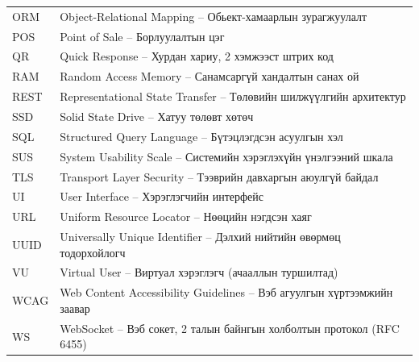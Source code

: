 \documentclass[12pt,a4paper]{report}
\begin{document}
\begin{longtable}{@{} p{3.5cm} p{11cm} @{}}
ORM & Object-Relational Mapping -- Обьект-хамаарлын зурагжуулалт \\[4pt]
POS & Point of Sale -- Борлуулалтын цэг \\[4pt]
QR & Quick Response -- Хурдан хариу, 2 хэмжээст штрих код \\[4pt]
RAM & Random Access Memory -- Санамсаргүй хандалтын санах ой \\[4pt]
REST & Representational State Transfer -- Төлөвийн шилжүүлгийн архитектур \\[4pt]
SSD & Solid State Drive -- Хатуу төлөвт хөтөч \\[4pt]
SQL & Structured Query Language -- Бүтэцлэгдсэн асуулгын хэл \\[4pt]
SUS & System Usability Scale -- Системийн хэрэглэхүйн үнэлгээний шкала \\[4pt]
TLS & Transport Layer Security -- Тээврийн давхаргын аюулгүй байдал \\[4pt]
UI & User Interface -- Хэрэглэгчийн интерфейс \\[4pt]
URL & Uniform Resource Locator -- Нөөцийн нэгдсэн хаяг \\[4pt]
UUID & Universally Unique Identifier -- Дэлхий нийтийн өвөрмөц тодорхойлогч \\[4pt]
VU & Virtual User -- Виртуал хэрэглэгч (ачааллын туршилтад) \\[4pt]
WCAG & Web Content Accessibility Guidelines -- Вэб агуулгын хүртээмжийн заавар \\[4pt]
WS & WebSocket -- Вэб сокет, 2 талын байнгын холболтын протокол (RFC 6455) \\[4pt]
\end{longtable}
\clearpage








\end{document}
